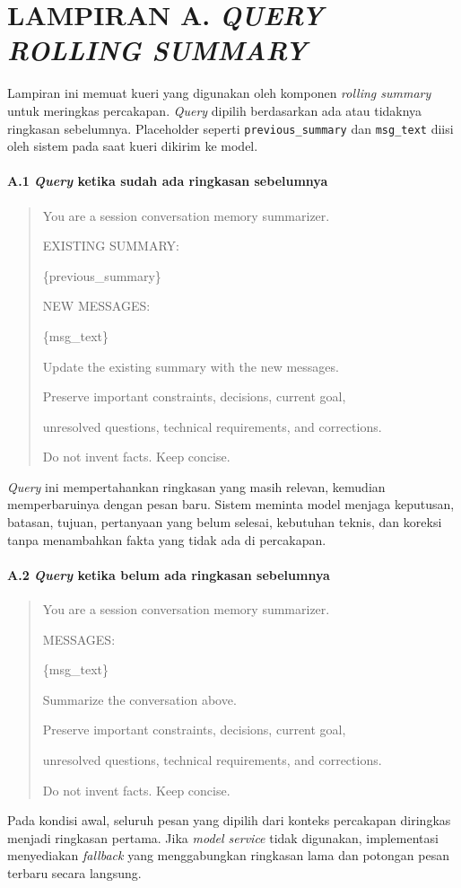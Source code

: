\clearpage
\chapter*{LAMPIRAN A. \emph{QUERY ROLLING SUMMARY}}

Lampiran ini memuat kueri yang digunakan oleh komponen \emph{rolling summary} untuk
meringkas percakapan. \emph{Query} dipilih berdasarkan ada atau tidaknya ringkasan
sebelumnya. Placeholder seperti \texttt{previous\_summary} dan
\texttt{msg\_text} diisi oleh sistem pada saat kueri dikirim ke model.

\subsubsection*{A.1 \emph{Query} ketika sudah ada ringkasan sebelumnya}
\begin{quote}\small\ttfamily\raggedright
You are a session conversation memory summarizer.\par
\par
EXISTING SUMMARY:\par
\{previous\_summary\}\par
\par
NEW MESSAGES:\par
\{msg\_text\}\par
\par
Update the existing summary with the new messages.\par
Preserve important constraints, decisions, current goal,\par
unresolved questions, technical requirements, and corrections.\par
Do not invent facts. Keep concise.
\end{quote}

\emph{Query} ini mempertahankan ringkasan yang masih relevan, kemudian memperbaruinya
dengan pesan baru. Sistem meminta model menjaga keputusan, batasan, tujuan,
pertanyaan yang belum selesai, kebutuhan teknis, dan koreksi tanpa menambahkan
fakta yang tidak ada di percakapan.

\subsubsection*{A.2 \emph{Query} ketika belum ada ringkasan sebelumnya}
\begin{quote}\small\ttfamily\raggedright
You are a session conversation memory summarizer.\par
\par
MESSAGES:\par
\{msg\_text\}\par
\par
Summarize the conversation above.\par
Preserve important constraints, decisions, current goal,\par
unresolved questions, technical requirements, and corrections.\par
Do not invent facts. Keep concise.
\end{quote}

Pada kondisi awal, seluruh pesan yang dipilih dari konteks percakapan diringkas
menjadi ringkasan pertama. Jika \emph{model service} tidak digunakan, implementasi
menyediakan \emph{fallback} yang menggabungkan ringkasan lama dan potongan pesan
terbaru secara langsung.
